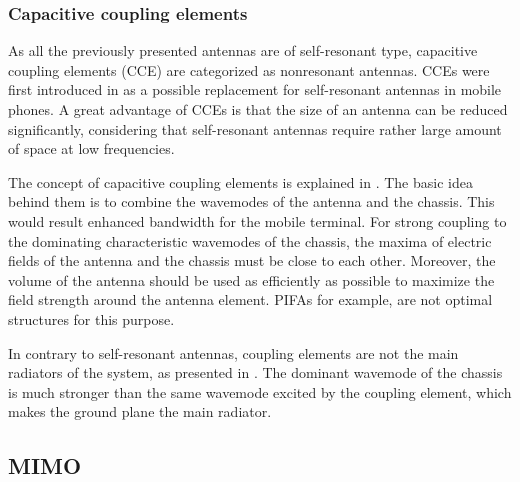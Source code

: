\subsubsection{Capacitive coupling elements}
\label{sec:cce}
As all the previously presented antennas are of self-resonant type, capacitive coupling elements (CCE) are categorized as nonresonant antennas. CCEs were first introduced in \cite{vainikainen_resonator_analysis} as a possible replacement for self-resonant antennas in mobile phones. A great advantage of CCEs is that the size of an antenna can be reduced significantly, considering that self-resonant antennas require rather large amount of space at low frequencies. 

The concept of capacitive coupling elements is explained in \cite{vainikainen_resonator_analysis, villanen_cce}. The basic idea behind them is to combine the wavemodes of the antenna and the chassis. This would result enhanced bandwidth for the mobile terminal. For strong coupling to the dominating characteristic wavemodes of the chassis, the maxima of electric fields of the antenna and the chassis must be close to each other. Moreover, the volume of the antenna should be used as efficiently as possible to maximize the field strength around the antenna element. PIFAs for example, are not optimal structures for this purpose. 

In contrary to self-resonant antennas, coupling elements are not the main radiators of the system, as presented in \cite{villanen_cce}. The dominant wavemode of the chassis is much stronger than the same wavemode excited by the coupling element, which makes the ground plane the main radiator.

\subsection{MIMO}
\label{sec:mimo}

\clearpage